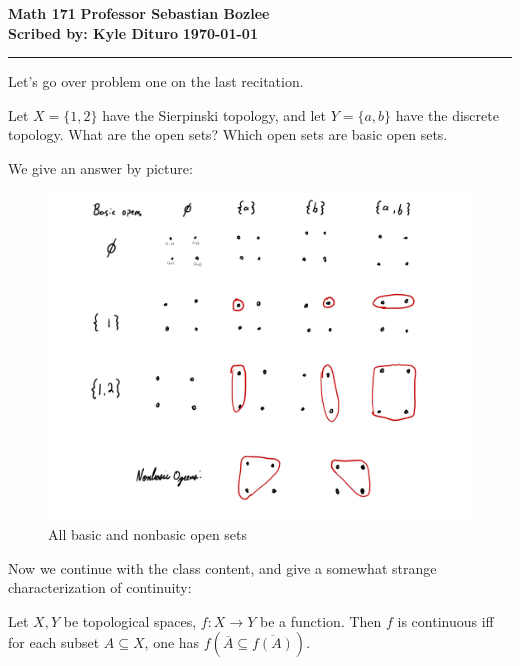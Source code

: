 \documentclass[12pt, twosided]{article}
\begin{document}
\noindent \textbf{Math 171} \hfill \textbf{Professor Sebastian Bozlee} \\
\textbf{Scribed by: Kyle Dituro} \hfill \textbf{\today}\hrule
\vspace{.2in}

Let's go over problem one on the last recitation.

\begin{ques}
  Let \(X = \{1, 2\}\) have the Sierpinski topology, and let \(Y = \{a, b\}\) have the discrete topology. What are the open sets? Which open sets are basic open sets.
\end{ques}

We give an answer by picture:

\begin{figure}[h]
  \centering
  \includegraphics[width=\textwidth]{openchart}
  \caption{All basic and nonbasic open sets}
\end{figure}

Now we continue with the class content, and give a somewhat strange characterization of continuity:

\begin{thm}
  Let \(X, Y\) be topological spaces, \(f: X \to Y\) be a function. Then \(f\) is continuous iff for each subset \(A \subseteq X\), one has \(f(\overline{A} \subseteq \overline{f(A)})\).
\end{thm}
\end{document}
